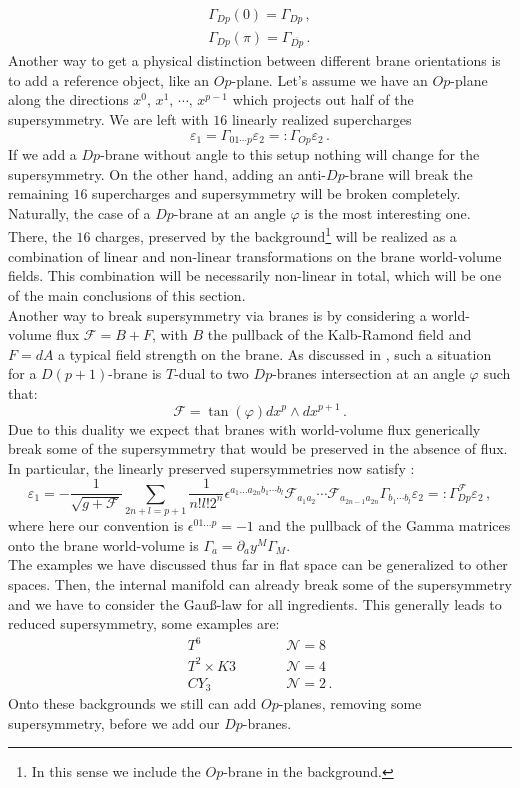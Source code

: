 \documentclass[12pt]{report}
\newcommand{\be}{\begin{equation}}
\newcommand{\ee}{\end{equation}}
\newcommand{\bea}{\begin{equation}\begin{aligned}}
\newcommand{\eea}{\end{aligned}\end{equation}}
\begin{document}
\bea
\Gamma_{Dp} (0) = \Gamma_{Dp}\,,\\
\Gamma_{Dp} (\pi) = \Gamma_{\overline{Dp}}\,.
\eea
Another way to get a physical distinction between different brane orientations is to add a reference object, like an $Op$-plane. Let's assume we have an $Op$-plane along the directions $x^0,\,x^1,\,\cdots ,\, x^{p-1}$ which projects out half of the supersymmetry. We are left with $16$ linearly realized supercharges 
\be 
\varepsilon_1 = \Gamma_{01\cdots p} \varepsilon_2 =: \Gamma_{Op}\varepsilon_2\,.
\ee
If we add a $Dp$-brane without angle to this setup nothing will change for the supersymmetry. On the other hand, adding an anti-$Dp$-brane will break the remaining $16$ supercharges and supersymmetry will be broken completely. Naturally, the case of a $Dp$-brane at an angle $\varphi$ is the most interesting one. There, the $16$ charges, preserved by the background\footnote{In this sense we include the $Op$-brane in the background.} will be realized as a combination of linear and non-linear transformations on the brane world-volume fields. This combination will be necessarily non-linear in total, which will be one of the main conclusions of this section.\\
Another way to break supersymmetry via branes is by considering a world-volume flux $\mathcal{F}=B+F$, with $B$ the pullback of the Kalb-Ramond field and $F=dA$ a typical field strength on the brane. As discussed in \cite{Johnson:2003glb}, such a situation for a $D(p+1)$-brane is $T$-dual to two $Dp$-branes intersection at an angle $\varphi$ such that:
\be 
\mathcal{F} = \tan (\varphi) dx^p \wedge dx^{p+1}\,.
\ee
Due to this duality we expect that branes with world-volume flux generically break some of the supersymmetry that would be preserved in the absence of flux. In particular, the linearly preserved supersymmetries now satisfy \cite{Koerber:2010bx}:
\be 
\varepsilon_1 = - \frac{1}{\sqrt{g+\mathcal{F}}} \sum_{2n+l=p+1} \frac{1}{n!l!2^n} \epsilon^{a_1\dots a_{2n}b_1 \cdots b_l} \mathcal{F}_{a_1 a_2 } \cdots \mathcal{F}_{a_{2n-1}a_{2n}} \Gamma_{b_1 \cdots b_l} \varepsilon_2 =: \Gamma_{Dp}^{\mathcal{F}}\varepsilon_2\,,
\ee
where here our convention is $\epsilon^{01\dots p} = -1$ and the pullback of the Gamma matrices onto the brane world-volume is $\Gamma_a = \partial_a y^M \Gamma_M$.\\
The examples we have discussed thus far in flat space can be generalized to other spaces. Then, the internal manifold can already break some of the supersymmetry and we have to consider the Gauß-law for all ingredients. This generally leads to reduced supersymmetry, some examples are:
\be 
\begin{matrix}
     T^6 &\qquad& \mathcal{N}=8\,\\
     T^2 \times K3 &\qquad& \mathcal{N}=4\,\\
     CY_3 &\qquad& \mathcal{N}=2\,.
\end{matrix}
\ee
Onto these backgrounds we still can add $Op$-planes, removing some supersymmetry, before we add our $Dp$-branes. 
\end{document}
